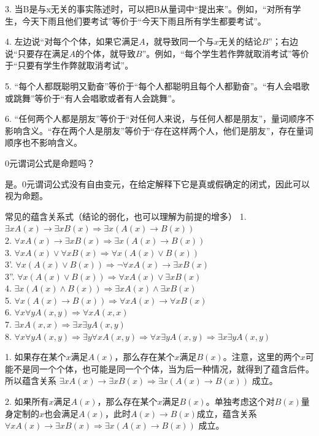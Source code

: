 3. 当B是与x无关的事实陈述时，可以把B从量词中“提出来”。例如，“对所有学生，今天下雨且他们要考试”等价于“今天下雨且所有学生都要考试”。

4. 左边说“对每个个体，如果它满足$A$，就导致同一个与$x$无关的结论$B$”；右边说“只要存在满足$A$的个体，就导致$B$”。例如，“每个学生若作弊就取消考试”等价于“只要有学生作弊就取消考试”。

5. “每个人都既聪明又勤奋”等价于“每个人都聪明且每个人都勤奋”。“有人会唱歌或跳舞”等价于“有人会唱歌或者有人会跳舞”。

6. “任何两个人都是朋友”等价于“对任何人来说，与任何人都是朋友”，量词顺序不影响含义。“存在两个人是朋友”等价于“存在这样两个人，他们是朋友”，存在量词顺序也不影响含义。
\begin{example}{}{}
    0元谓词公式是命题吗？
\end{example}
是。0元谓词公式没有自由变元，在给定解释下它是真或假确定的闭式，因此可以视为命题。
\begin{theorem}{常见的蕴含关系式（结论的弱化，也可以理解为前提的增多）}{}
1. $\exists xA(x)\to\exists xB(x)\Rightarrow\exists x(A(x)\to B(x))$\\
2. $\forall xA(x)\to \exists xB(x)\Rightarrow \exists x(A(x)\to B(x))$\\
3. $\forall xA(x)\lor \forall xB(x)\Rightarrow \forall x(A(x)\lor B(x))$\\
3'. $\forall x(A(x)\lor B(x))\Rightarrow \neg\forall xA(x)\to\exists xB(x)$\\
3''. $\forall x(A(x)\lor B(x))\Rightarrow \forall xA(x)\lor \exists xB(x)$\\
4. $\exists x(A(x)\land B(x))\Rightarrow \exists xA(x)\land \exists xB(x)$\\
5. $\forall x(A(x)\to B(x))\Rightarrow \forall xA(x)\to \forall xB(x)$\\
6. $\forall x\forall yA(x,y)\Rightarrow \forall xA(x,x)$\\
7. $\exists xA(x,x)\Rightarrow \exists x\exists yA(x,y)$\\
8. $\forall x\forall yA(x,y)\Rightarrow \exists y\forall xA(x,y)\Rightarrow \forall x\exists yA(x,y)\Rightarrow \exists x\exists yA(x,y)$
\end{theorem}
1. 如果存在某个$x$满足$A(x)$，那么存在某个$x$满足$B(x)$。注意，这里的两个$x$可能不是同一个个体，也可能是同一个个体，当为后一种情况，就得到了蕴含后件。所以蕴含关系 $\exists xA(x)\to\exists xB(x)\Rightarrow\exists x(A(x)\to B(x))$ 成立。

2. 如果所有$x$满足$A(x)$，那么存在某个$x$满足$B(x)$。单独考虑这个对$B(x)$量身定制的$x$也会满足$A(x)$，此时$A(x)\to B(x)$成立，蕴含关系 $\forall xA(x)\to \exists xB(x)\Rightarrow \exists x(A(x)\to B(x))$ 成立。

